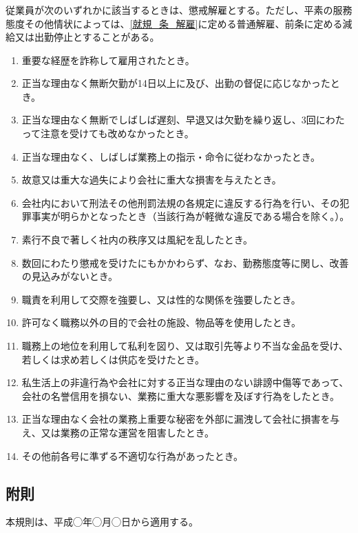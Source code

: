 \documentclass{jsarticle}
\begin{document}
\subsubsection{}
\label{就規_項_懲戒解雇}
従業員が次のいずれかに該当するときは、懲戒解雇とする。ただし、平素の服務態度その他情状によっては、\ref{就規_条_解雇}に定める普通解雇、前条に定める減給又は出勤停止とすることがある。
  \begin{enumerate}
    \item 重要な経歴を詐称して雇用されたとき。
    \item 正当な理由なく無断欠勤が14日以上に及び、出勤の督促に応じなかったとき。
    \item 正当な理由なく無断でしばしば遅刻、早退又は欠勤を繰り返し、3回にわたって注意を受けても改めなかったとき。
    \item 正当な理由なく、しばしば業務上の指示・命令に従わなかったとき。
    \item 故意又は重大な過失により会社に重大な損害を与えたとき。
    \item 会社内において刑法その他刑罰法規の各規定に違反する行為を行い、その犯罪事実が明らかとなったとき（当該行為が軽微な違反である場合を除く。）。
    \item 素行不良で著しく社内の秩序又は風紀を乱したとき。
    \item 数回にわたり懲戒を受けたにもかかわらず、なお、勤務態度等に関し、改善の見込みがないとき。
    \item 職責を利用して交際を強要し、又は性的な関係を強要したとき。
    \item 許可なく職務以外の目的で会社の施設、物品等を使用したとき。
    \item 職務上の地位を利用して私利を図り、又は取引先等より不当な金品を受け、若しくは求め若しくは供応を受けたとき。
    \item 私生活上の非違行為や会社に対する正当な理由のない誹謗中傷等であって、会社の名誉信用を損ない、業務に重大な悪影響を及ぼす行為をしたとき。
    \item 正当な理由なく会社の業務上重要な秘密を外部に漏洩して会社に損害を与え、又は業務の正常な運営を阻害したとき。
    \item その他前各号に準ずる不適切な行為があったとき。
  \end{enumerate}

\fusoku{}
\subsection{附則}
本規則は、平成◯年◯月◯日から適用する。
\end{document}
